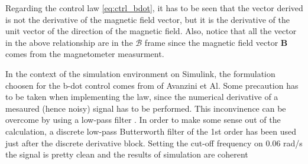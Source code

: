 Regarding the control law \autoref{eq:ctrl_bdot}, it has to be seen that the vector derived is not the derivative of the magnetic field vector, but it is the derivative of the unit vector of the 
direction of the magnetic field. Also, notice that all the vector in the above relationship are in the $\mathcal{B}$ frame since the magnetic 
field vector $\boldsymbol{B}$ comes from the magnetometer measurment.

In the context of the simulation environment on Simulink, the formulation choosen for the b-dot control comes from \cite{bdot} of Avanzini et Al. Some precaution has to be taken
when implementing the law, since the numerical derivative of a mesaured (hence noisy) signal has to be performed. This inconvinence can be overcome by using a low-pass filter \cite{crass_book}.
In order to make some sense out of the calculation, a discrete low-pass Butterworth filter of the 1st order has been used just after the discrete derivative block. 
Setting the cut-off frequency on 0.06 rad/s the signal is pretty clean and the results of simulation are coherent


